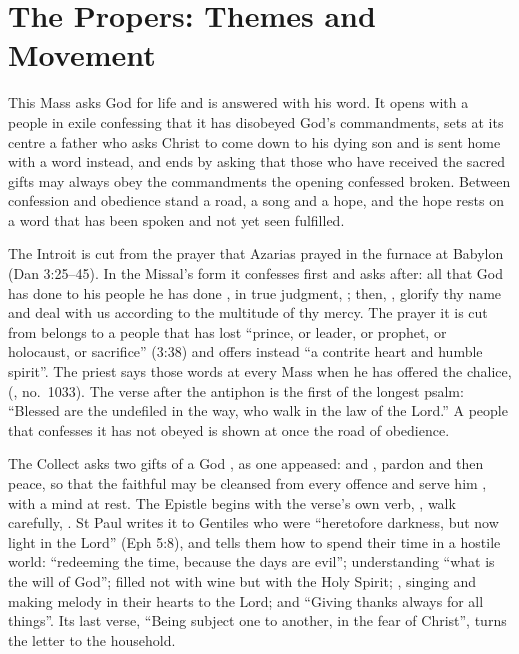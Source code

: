 
\section{The Propers: Themes and Movement}

This Mass asks God for life and is answered with his word. It opens with a
people in exile confessing that it has disobeyed God's commandments, sets at
its centre a father who asks Christ to come down to his dying son and is sent
home with a word instead, and ends by asking that those who have received the
sacred gifts may always obey the commandments the opening confessed broken.
Between confession and obedience stand a road, a song and a hope, and the hope
rests on a word that has been spoken and not yet seen fulfilled.

The Introit is cut from the prayer that Azarias prayed in the furnace at
Babylon (Dan 3:25--45). In the Missal's form it confesses first and asks
after: all that God has done to his people he has done , in true judgment, ; then, , glorify thy name and
deal with us according to the multitude of thy mercy. The prayer it is cut
from belongs to a people that has lost ``prince, or leader, or prophet, or
holocaust, or sacrifice'' (3:38) and offers instead ``a contrite heart and
humble spirit''. The priest says those words at every Mass when he has offered
the chalice,  (, no.~1033). The verse after the antiphon is the
first of the longest psalm: ``Blessed are the undefiled in the way, who walk in
the law of the Lord.'' A people that confesses it has not obeyed is shown at
once the road of obedience.

The Collect asks two gifts of a God , as one appeased:
 and , pardon and then peace, so that the
faithful may be cleansed from every offence and serve him ,
with a mind at rest. The Epistle begins with the verse's own verb,
, walk carefully, . St Paul writes it to Gentiles who were
``heretofore darkness, but now light in the Lord'' (Eph 5:8), and tells them
how to spend their time in a hostile world: ``redeeming the time, because the
days are evil''; understanding ``what is the will of God''; filled not with
wine but with the Holy Spirit; , singing and making melody in their hearts to the Lord; and
``Giving thanks always for all things''. Its last verse, ``Being subject
one to another, in the fear of Christ'', turns the letter to the household.

